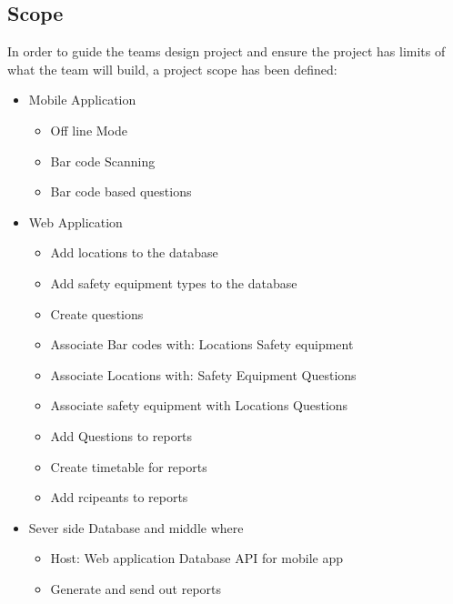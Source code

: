 \documentclass[Letter,11pt]{article}
\begin{document}
	\subsection{Scope}\label{scope}
	In order to guide the teams design project and ensure the project has limits of what the team will build, a project scope has been defined:
		\begin{itemize}
			\item Mobile Application
			\begin{itemize}
				\item Off line Mode
				\item Bar code Scanning
				\item Bar code based questions
			\end{itemize}
			\item Web Application
			\begin{itemize}
				\item Add locations to the database
				\item Add safety equipment types to the database
				\item Create questions
				\item Associate Bar codes with:
				\subitem Locations
				\subitem Safety equipment
				\item Associate Locations with:
				\subitem Safety Equipment
				\subitem Questions
				\item Associate safety equipment with
				\subitem Locations
				\subitem Questions
				\item Add Questions to reports
				\item Create timetable for reports
				\item Add rcipeants to reports
			\end{itemize}
			\item Sever side Database and middle where
			\begin{itemize}
				\item Host:
				\subitem Web application
				\subitem Database API for mobile app
				\item Generate and send out reports
			\end{itemize}
		\end{itemize}
\end{document}
